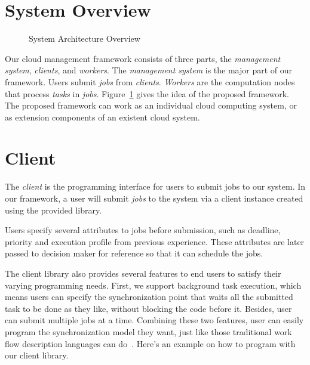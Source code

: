 \section{System Overview}	%

\begin{figure}[htbp]
\centering

\caption{System Architecture Overview}
\label{fig:archi-overview}
\end{figure}

Our cloud management framework consists of three parts, the \emph{
management system}, \emph{clients}, and \emph{workers}.
The \emph{management system} is the major part of our framework.
Users submit \emph{jobs} from \emph{clients}.
\emph{Workers} are the computation nodes that process \emph{tasks} in \emph{
jobs}.
Figure~\ref{fig:archi-overview} gives the idea of the proposed
framework.
The proposed framework can work as an individual cloud computing system,
or as extension components of an existent cloud system.

\section{Client}	%

The \emph{client} is the programming interface for users to submit jobs
to our system.
In our framework, a user will submit \emph{jobs} to the system via a
client instance created using the provided library.

Users specify several attributes to jobs before submission, such as
deadline, priority and execution profile from previous experience.
These attributes are later passed to decision maker for reference so
that it can schedule the jobs.

The client library also provides several features to end users to
satisfy their varying programming needs.
First, we support background task execution, which means users can
specify the synchronization point that waits all the submitted task to
be done as they like, without blocking the code before it.
Besides, user can submit multiple jobs at a time.
Combining these two features, user can easily program the
synchronization model they want, just like those traditional work flow
description languages can do~\cite{cite:workflow-management}.
Here's an example on how to program with our client library.

